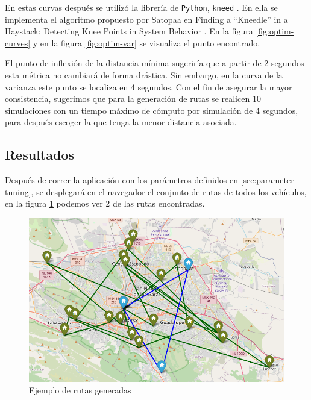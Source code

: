 \documentclass[journal]{IEEEtran}
\begin{document}
            En estas curvas después se utilizó la librería de \texttt{Python}, \texttt{kneed} \cite{kneed}. En ella se implementa el algoritmo propuesto por Satopaa en Finding a “Kneedle” in a Haystack: Detecting Knee Points in System Behavior \cite{satopaa2011finding}. En la figura \ref{fig:optim-curves} y en la figura \ref{fig:optim-var} se visualiza el punto encontrado.

            El punto de inflexión de la distancia mínima sugeriría que a partir de 2 segundos esta métrica no cambiará de forma drástica. Sin embargo, en la curva de la varianza este punto se localiza en 4 segundos. Con el fin de asegurar la mayor consistencia, sugerimos que para la generación de rutas se realicen 10 simulaciones con un tiempo máximo de cómputo por simulación de 4 segundos, para después escoger la que tenga la menor distancia asociada.

        \subsection{Resultados} \label{sec:results}

            Después de correr la aplicación con los parámetros definidos en \ref{sec:parameter-tuning}, se desplegará en el navegador el conjunto de rutas de todos los vehículos, en la figura \ref{fig:generated-routes} podemos ver 2 de las rutas encontradas.
        
            \begin{figure}[H]
                \centering
                \includegraphics[scale=0.4]{../img/route-examples.png}
                \caption{Ejemplo de rutas generadas} 
                \label{fig:generated-routes}
            \end{figure}
            
\end{document}
